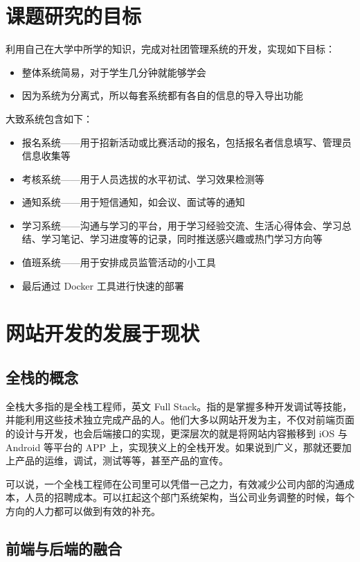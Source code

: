 \section{课题研究的目标}
\label{sec:goal-of-research}

利用自己在大学中所学的知识，完成对社团管理系统的开发，实现如下目标：
\begin{itemize}
  \item 整体系统简易，对于学生几分钟就能够学会
  \item 因为系统为分离式，所以每套系统都有各自的信息的导入导出功能
\end{itemize}
大致系统包含如下：
\begin{itemize}
  \item 报名系统——用于招新活动或比赛活动的报名，包括报名者信息填写、管理员信息收集等
  \item 考核系统——用于人员选拔的水平初试、学习效果检测等
  \item 通知系统——用于短信通知，如会议、面试等的通知
  \item 学习系统——沟通与学习的平台，用于学习经验交流、生活心得体会、学习总结、学习笔记、学习进度等的记录，同时推送感兴趣或热门学习方向等
  \item 值班系统——用于安排成员监管活动的小工具
  \item 最后通过 Docker 工具进行快速的部署
\end{itemize}

\section{网站开发的发展于现状}

\subsection{全栈的概念}

全栈大多指的是全栈工程师，英文 Full Stack。指的是掌握多种开发调试等技能，并能利用这些技术独立完成产品的人。他们大多以网站开发为主，不仅对前端页面的设计与开发，也会后端接口的实现，更深层次的就是将网站内容搬移到 iOS 与 Android 等平台的 APP 上，实现狭义上的全栈开发。如果说到广义，那就还要加上产品的运维，调试，测试等等，甚至产品的宣传。

可以说，一个全栈工程师在公司里可以凭借一己之力，有效减少公司内部的沟通成本，人员的招聘成本。可以扛起这个部门系统架构，当公司业务调整的时候，每个方向的人力都可以做到有效的补充。

\subsection{前端与后端的融合}

